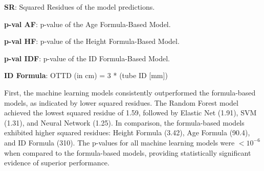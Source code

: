\documentclass[11pt]{article}
\begin{document}
\begin{table}[h]
\caption{Performance comparison among Machine Learning models and formula-based models}
\label{table:performance_comparison}
\begin{threeparttable}
\renewcommand{\TPTminimum}{\linewidth}
\begin{tablenotes}
\footnotesize
\item \textbf{SR}: Squared Residues of the model predictions.
\item \textbf{p-val AF}: p-value of the Age Formula-Based Model.
\item \textbf{p-val HF}: p-value of the Height Formula-Based Model.
\item \textbf{p-val IDF}: p-value of the ID Formula-Based Model.
\item \textbf{ID Formula}: OTTD (in cm) = 3 * (tube ID [mm])
\end{tablenotes}
\end{threeparttable}
\end{table}


First, the machine learning models consistently outperformed the formula-based models, as indicated by lower squared residues. The Random Forest model achieved the lowest squared residue of 1.59, followed by Elastic Net (1.91), SVM (1.31), and Neural Network (1.25). In comparison, the formula-based models exhibited higher squared residues: Height Formula (3.42), Age Formula (90.4), and ID Formula (310). The p-values for all machine learning models were $<$$10^{-6}$ when compared to the formula-based models, providing statistically significant evidence of superior performance.
\end{document}
